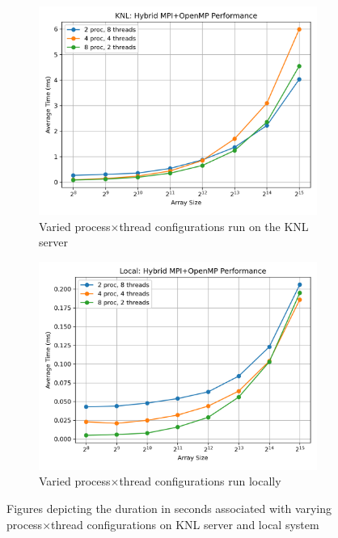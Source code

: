 \documentclass[11pt]{article}
\begin{document}
\begin{figure}[H]
\centering
\begin{subfigure}[t]{0.48\textwidth}
  \centering
    \includegraphics[width=\textwidth]{./images/knlq7.png}
  \caption{Varied process$\times$thread configurations run on the KNL server}\label{fig:knlq7}
\end{subfigure}%
\hfill
\begin{subfigure}[t]{0.48\textwidth}
  \centering
    \includegraphics[width=\textwidth]{./images/localq7.png}
  \caption{Varied process$\times$thread configurations run locally}\label{fig:localq7}
\end{subfigure}%
\caption{Figures depicting the duration in seconds associated with varying process$\times$thread configurations on KNL server and local system}
\label{fig:gq7}
\end{figure}
\end{document}
